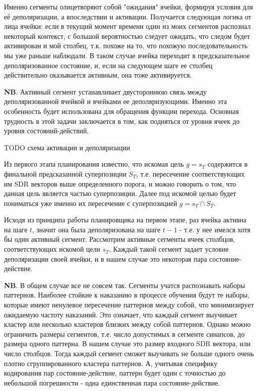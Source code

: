 \documentclass[a4paper]{article}
\begin{document}
Именно сегменты олицетворяют собой "ожидания" ячейки, формируя условия для её деполяризации, а впоследствии и активации. Получается следующая логика от лица ячейки: если в текущий момент времени один из моих сегментов распознал некоторый контекст, с большой вероятностью следует ожидать, что следом будет активирован и мой столбец, т.к. похоже на то, что похожую последовательность мы уже раньше наблюдали. В таком случае ячейка переходит в предсказательное деполяризованное состояние, и, если на следующем шаге ее столбец действительно оказывается активным, она тоже активируется.

\textbf{NB}. Активный сегмент устанавливает двустороннюю связь между деполяризованной ячейкой и ячейками ее деполяризующими. Именно эта особенность будет использована для обращения функции перехода. Основная трудность в этой задачи заключается в том, как подняться от уровня ячеек до уровня состояний-действий.

TODO схема активации и деполяризации

Из первого этапа планирования известно, что искомая цель $g = s_T$ содержится в финальной предсказанной суперпозиции $S_T$, т.е. пересечение соответствующих им SDR векторов выше определенного порога, и можно говорить о том, что данная цель является частью суперпозиции. Далее под искомой целью будет пониматься уже именно их пересечение с суперпозицией $g = s_T \cap S_T$.

Исходя из принципа работы планировщика на первом этапе, раз ячейка активна на шаге $t$, значит она была деполяризована на шаге $t-1$ - т.е. у нее имелся хотя бы один активный сегмент. Рассмотрим активные сегменты ячеек столбцов, соответствующих искомой цели $s_T$. Каждый такой сегмент задает условие деполяризации своей ячейки, и в нашем случае это некоторая пара состояние-действие.

\begin{framed}
  \textbf{NB}. В общем случае все не совсем так. Сегменты учатся распознавать наборы паттернов. Наиболее стойкие к наказанию в процессе обучения будут те наборы, которые имеют ненулевое пересечение паттернов между собой, что минимизирует ожидаемую частоту наказаний. Это означает, что каждый сегмент выучивает кластер или несколько кластеров близких между собой паттернов. Однако можно ограничить размеры сегментов, т.е. число допустимых в сегменте синапсов, до размера одного паттерна. В нашем случае это размер входного SDR вектора, или число столбцов. Тогда каждый сегмент сможет выучивать не больше одного очень плотно сгруппированного кластера паттернов. А, учитывая специфику кодирования пар состояние-действие, паттерн будет один с точностью до небольшой погрешности - одна единственная пара состояние-действие.
\end{framed}
\end{document}
